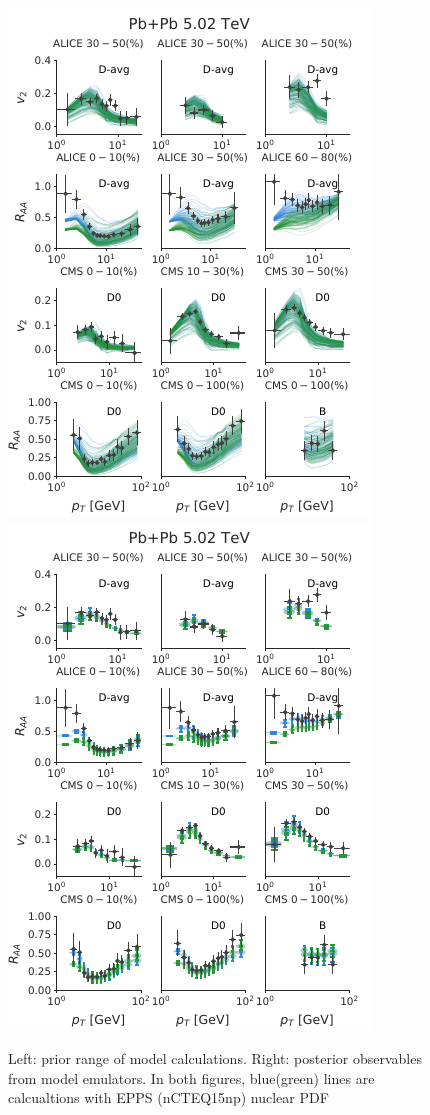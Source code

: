 \documentclass[aps, prc, reprint, amsmath, groupedaddress, nofootinbib]{revtex4-1}
\begin{document}
\begin{figure}
\includegraphics[width=.49\textwidth]{observables_design.pdf}
\includegraphics[width=.49\textwidth]{observables_posterior.pdf}
\caption{Left: prior range of model calculations. Right: posterior observables from model emulators. In both figures, blue(green) lines are calcualtions with EPPS (nCTEQ15np) nuclear PDF}\label{plots:deisgn_posterior_obs}
\end{figure}
\end{document}
